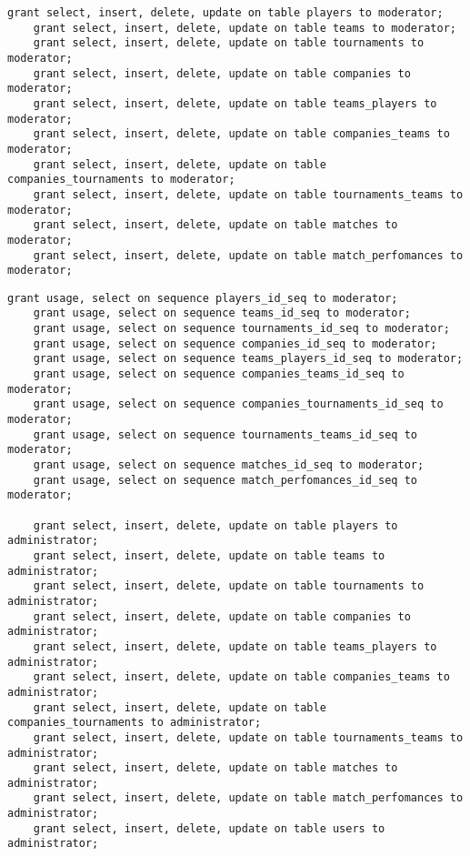 \begin{appendices}
\begin{lstlisting}[caption={Сценарий создания ролевой модели в базе данных (часть 2)}]
	grant select, insert, delete, update on table players to moderator;
	grant select, insert, delete, update on table teams to moderator;
	grant select, insert, delete, update on table tournaments to moderator;
	grant select, insert, delete, update on table companies to moderator;
	grant select, insert, delete, update on table teams_players to moderator;
	grant select, insert, delete, update on table companies_teams to moderator;
	grant select, insert, delete, update on table companies_tournaments to moderator;
	grant select, insert, delete, update on table tournaments_teams to moderator;
	grant select, insert, delete, update on table matches to moderator;
	grant select, insert, delete, update on table match_perfomances to moderator;
\end{lstlisting}

\clearpage

\begin{lstlisting}[caption={Сценарий создания ролевой модели в базе данных (часть 3)}]
	grant usage, select on sequence players_id_seq to moderator;
	grant usage, select on sequence teams_id_seq to moderator;
	grant usage, select on sequence tournaments_id_seq to moderator;
	grant usage, select on sequence companies_id_seq to moderator;
	grant usage, select on sequence teams_players_id_seq to moderator;
	grant usage, select on sequence companies_teams_id_seq to moderator;
	grant usage, select on sequence companies_tournaments_id_seq to moderator;
	grant usage, select on sequence tournaments_teams_id_seq to moderator;
	grant usage, select on sequence matches_id_seq to moderator;
	grant usage, select on sequence match_perfomances_id_seq to moderator;
	
	grant select, insert, delete, update on table players to administrator;
	grant select, insert, delete, update on table teams to administrator;
	grant select, insert, delete, update on table tournaments to administrator;
	grant select, insert, delete, update on table companies to administrator;
	grant select, insert, delete, update on table teams_players to administrator;
	grant select, insert, delete, update on table companies_teams to administrator;
	grant select, insert, delete, update on table companies_tournaments to administrator;
	grant select, insert, delete, update on table tournaments_teams to administrator;
	grant select, insert, delete, update on table matches to administrator;
	grant select, insert, delete, update on table match_perfomances to administrator;
	grant select, insert, delete, update on table users to administrator;
	

\end{lstlisting}
\end{appendices}
